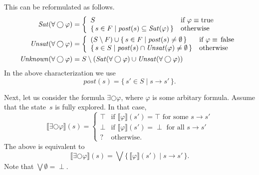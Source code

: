 \documentclass[12pt]{article}
\newcommand{\nxt}{\bigcirc}
\newcommand{\TRUE}{\mbox{\lstinline{true}}}
\newcommand{\FALSE}{\mbox{\lstinline{false}}}
\theoremstyle{definition}
\newcommand{\satisfaction}[1]{\llbracket #1 \rrbracket}
\begin{document}
This can be reformulated as follows.
\begin{align*}
\mathit{Sat}(\forall \nxt \varphi) & = 
\left \{
\begin{array}{ll}
S & \mbox{if $\varphi \equiv \TRUE$}\\
\{\, s \in F \mid \mathit{post}(s) \subseteq \mathit{Sat}(\varphi) \,\} & \mbox{otherwise}
\end{array}
\right .\\
\mathit{Unsat}(\forall \nxt \varphi) & = 
\left \{
\begin{array}{ll}
(S \setminus F) \cup \{\, s \in F \mid \mathit{post}(s) \not= \emptyset \,\}& \mbox{if $\varphi \equiv \FALSE$}\\
\{\, s \in S \mid \mathit{post}(s) \cap \mathit{Unsat}(\varphi) \not= \emptyset \,\} & \mbox{otherwise}
\end{array}
\right .\\
\mathit{Unknown}(\forall \nxt \varphi) & = S \setminus (\mathit{Sat}(\forall \nxt \varphi) \cup \mathit{Unsat}(\forall \nxt \varphi))
\end{align*}
In the above characterization we use
\[
\mathit{post}(s) = \{\, s' \in S \mid s \rightarrow s' \,\}.
\]

Next, let us consider the formula $\exists \nxt \varphi$, where $\varphi$ is some arbitary formula.  Assume that the state~$s$ is fully explored.  In that case,
\[
\satisfaction{\exists \nxt \varphi}(s) = \left \{
\begin{array}{ll}
\top & \mbox{if $\satisfaction{\varphi}(s') = \top$ for some $s \rightarrow s'$}\\
\perp & \mbox{if $\satisfaction{\varphi}(s') = \perp$ for all $s \rightarrow s'$}\\
? & \mbox{otherwise.}
\end{array}
\right .
\]
The above is equivalent to
\[
\satisfaction{\exists \nxt \varphi}(s) = \bigvee \{\, \satisfaction{\varphi}(s') \mid s \rightarrow s' \,\}.
\]
Note that $\bigvee \emptyset = \perp$.
\end{document}
